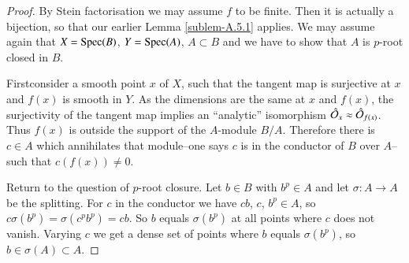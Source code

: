 \begin{proof}
By Stein factorisation we may assume $f$ to be finite. Then it is
actually a bijection, so that our earlier Lemma \ref{sublem-A.5.1}
applies. We may assume again that $X=\operatorname{Spec}(B)$, $Y=\operatorname{Spec}(A)$,
$A\subset B$ and we have to show that $A$ is $p$-root closed in $B$. 

First\pageoriginale consider\label{page89} a smooth point $x$ of $X$, such that the
tangent map is surjective at $x$ and $f(x)$ is smooth in $Y$. As the
dimensions are the same at $x$ and $f(x)$, the surjectivity of the
tangent map implies an ``analytic'' isomorphism $\hat{\mathcal{O}}_{x}\approx
\hat{\mathcal{O}}_{f(x)}$. Thus $f(x)$ is outside the support of the $A$-module
$B/A$. Therefore there is $c\in A$ which annihilates that module--one
says $c$ is in the conductor of $B$ over $A$--such that $c(f(x))\neq
0$.

Return to the question of $p$-root closure. Let $b\in B$ with
$b^{p}\in A$ and let $\sigma:A\to A$ be the splitting. For $c$ in the
conductor we have $cb$, $c$, $b^{p}\in A$, so $c\sigma
(b^{p})=\sigma(c^{p}b^{p})=cb$. So $b$ equals $\sigma(b^{p})$ at all
points where $c$ does not vanish. Varying $c$ we get a dense set of
points where $b$ equals $\sigma(b^{p})$, so $b\in \sigma(A)\subset A$.
\end{proof}

\newpage


